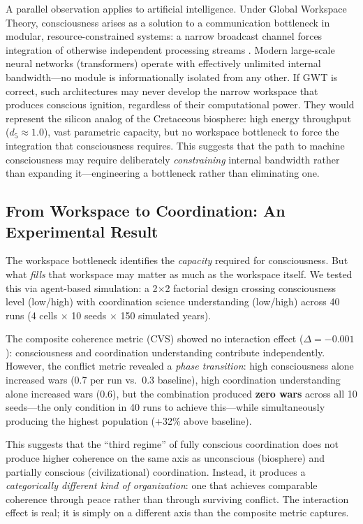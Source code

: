 \documentclass[10pt,letterpaper]{article}
\begin{document}
A parallel observation applies to artificial intelligence. Under Global
Workspace Theory, consciousness arises as a solution to a communication
bottleneck in modular, resource-constrained systems: a narrow broadcast
channel forces integration of otherwise independent processing streams
\cite{baars1988}. Modern large-scale neural networks (transformers) operate
with effectively unlimited internal bandwidth---no module is informationally
isolated from any other. If GWT is correct, such architectures may never
develop the narrow workspace that produces conscious ignition, regardless of
their computational power. They would represent the silicon analog of the
Cretaceous biosphere: high energy throughput ($d_5 \approx 1.0$), vast
parametric capacity, but no workspace bottleneck to force the integration
that consciousness requires. This suggests that the path to machine
consciousness may require deliberately \emph{constraining} internal
bandwidth rather than expanding it---engineering a bottleneck rather than
eliminating one.

\subsection*{From Workspace to Coordination: An Experimental Result}

The workspace bottleneck identifies the \emph{capacity} required for
consciousness. But what \emph{fills} that workspace may matter as much as
the workspace itself. We tested this via agent-based simulation:
a 2$\times$2 factorial design crossing consciousness level (low/high)
with coordination science understanding (low/high) across 40 runs
(4 cells $\times$ 10 seeds $\times$ 150 simulated years).

The composite coherence metric (CVS) showed no interaction effect
($\Delta = -0.001$): consciousness and coordination understanding
contribute independently. However, the conflict metric revealed a
\emph{phase transition}: high consciousness alone increased wars
(0.7 per run vs.\ 0.3 baseline), high coordination understanding alone
increased wars (0.6), but the combination produced \textbf{zero wars}
across all 10 seeds---the only condition in 40 runs to achieve this---while
simultaneously producing the highest population (+32\% above baseline).

This suggests that the ``third regime'' of fully conscious coordination
does not produce higher coherence on the same axis as unconscious
(biosphere) and partially conscious (civilizational) coordination. Instead,
it produces a \emph{categorically different kind of organization}:
one that achieves comparable coherence through peace rather than through
surviving conflict. The interaction effect is real; it is simply on a
different axis than the composite metric captures.
\end{document}
